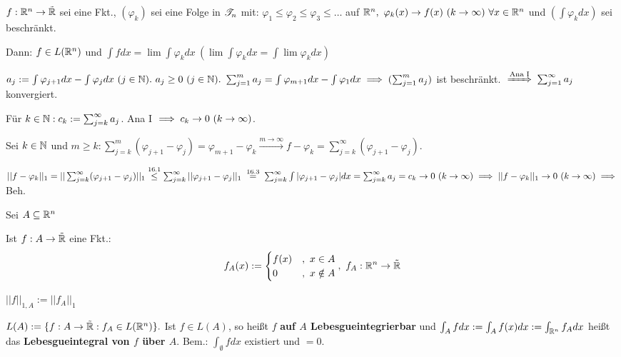 \documentclass[a4paper,twoside,DIV15,BCOR12mm]{scrbook}
\begin{document}
\begin{satz}
$f:\mathbb{R}^n\to\tilde{\mathbb{R}}$ sei eine Fkt., $(\varphi_k)$ sei eine Folge in $\mathscr{T}_n$ mit: $\varphi_1\le\varphi_2\le\varphi_3\le\ldots$ auf $\MdR^n,\ \varphi_k(x)\to f(x)\ (k\to\infty)\ \forall x\in\MdR^n$ und $(\int\varphi_k dx)$ sei beschränkt.

Dann: $f \in L(\mathbb{R}^n)$ und $\int fdx = \lim\int\varphi_k dx\ (\lim\int\varphi_k dx = \int\lim\varphi_k dx)$
\end{satz}

\begin{beweis}
$a_j:=\int\varphi_{j+1} dx - \int\varphi_j dx\ (j\in\mathbb{N}).\ a_j\ge 0\ (j\in\mathbb{N}).\ \sum_{j=1}^m a_j = \int\varphi_{m+1} dx - \int \varphi_1 dx \implies (\sum_{j=1}^m a_j)$ ist beschränkt. $\folgtnach{Ana I} \sum_{j=1}^\infty a_j$ konvergiert.

Für $k\in\mathbb{N}: c_k := \sum_{j=k}^\infty a_j$. Ana I $\folgt c_k \to 0\ (k\to\infty)$.

Sei $k\in\mathbb{N}$ und $m\ge k: \sum_{j=k}^m(\varphi_{j+1} - \varphi_j) = \varphi_{m+1} - \varphi_k \overset{m\to\infty}{\to} f-\varphi_k = \sum_{j=k}^\infty(\varphi_{j+1} - \varphi_j).$

$||f-\varphi_k||_1 = ||\sum_{j=k}^\infty(\varphi_{j+1} - \varphi_j)||_1 \overset{\text{16.1}}{\le} \sum_{j=k}^\infty||\varphi_{j+1}-\varphi_j||_1 \gleichnach{16.3} \sum_{j=k}^\infty \int|\varphi_{j+1}-\varphi_j| dx = \sum_{j=k}^\infty a_j = c_k \to 0\ (k\to\infty) \folgt ||f-\varphi_k||_1 \to 0\ (k\to\infty) \folgt$ Beh.
\end{beweis}

\begin{definition}
Sei $A\subseteq \mathbb{R}^n$
\begin{liste}
\item Ist $f:A\to\tilde{\mathbb{R}}$ eine Fkt.:
$$f_A(x) := \begin{cases}
f(x) & ,\ x\in A \\
0    & ,\ x\notin A \\
\end{cases}
,\ f_A:\mathbb{R}^n\to\tilde{\mathbb{R}}$$

$||f||_{1,A} := ||f_A||_1$

\item $L(A) := \{f:A\to\tilde{\mathbb{R}}:f_A\in L(\mathbb{R}^n)\}.$ Ist $f\in L(A)$, so heißt $f$ \textbf{auf $A$ Lebesgueintegrierbar} und $\int_Afdx := \int_Af(x)dx := \int_{\mathbb{R}^n}f_Adx$ heißt das \textbf{Lebesgueintegral von $f$ über $A$}. Bem.: $\int_\emptyset fdx$ existiert und $=0$.
\end{liste}
\end{definition}
\end{document}
